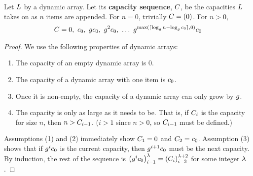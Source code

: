 \begin{lemma}
\label{lem:CapacitySeq}
	Let $L$ by a dynamic array. Let its \textbf{capacity sequence}, $C$, be the capacities $L$ takes on as $n$ items are appended. For $n = 0$, trivially $C = (0)$. For $n > 0$,
	\begin{align*}
	\VarCapacitySeq = 0,\ \VarInitCapacity,\ \VarGrowthFactor\VarInitCapacity,\ \VarGrowthFactor^2\VarInitCapacity,\ \ldots\ \VarGrowthFactor^{\max(\lceil \log_{\VarGrowthFactor} n - \log_{\VarGrowthFactor} \VarInitCapacity \rceil, 0)}\VarInitCapacity
	\end{align*}
\end{lemma}

\begin{proof}
	We use the following properties of dynamic arrays:
	\begin{enumerate}
		\item The capacity of an empty dynamic array is $0$.
		\item The capacity of a dynamic array with one item is $c_0$.
		\item Once it is non-empty, the capacity of a dynamic array can only grow by $g$.
		\item The capacity is only as large as it needs to be. That is, if $C_i$ is the capacity for size $n$, then $n > C_{i - 1}$. ($i > 1$ since $n > 0$, so $C_{i - 1}$ must be defined.)
	\end{enumerate}
	Assumptions (1) and (2) immediately show $C_1 = 0$ and $C_2 = c_0$. Assumption (3) shows that if $g^ic_0$ is the current capacity, then $g^{i + 1}c_0$ must be the next capacity. By induction, the rest of the sequence is $\left( g^ic_0 \right)_{i = 1}^\lambda = \left( C_i \right)_{i = 3}^{\lambda + 2}$ for some integer $\lambda$.
	

\end{proof}
